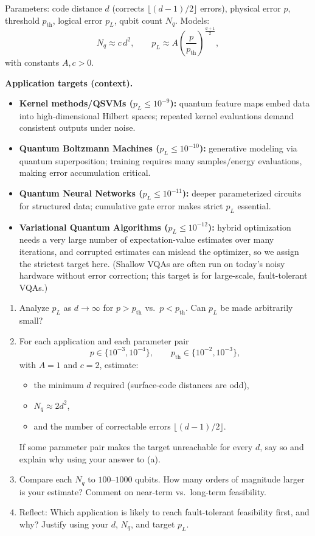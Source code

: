 \documentclass[11pt]{article}
\begin{document}
Parameters: code distance $d$ (corrects $\lfloor(d-1)/2\rfloor$ errors), physical error $p$, threshold $p_{\mathrm{th}}$, logical error $p_L$, qubit count $N_q$. Models:
\[
N_q \approx c\,d^2,\qquad
p_L \approx A\!\left(\frac{p}{p_{\mathrm{th}}}\right)^{\tfrac{d+1}{2}}\!,
\]
with constants $A,c>0$.

\textbf{Application targets (context).}
\begin{itemize}
  \item \textbf{Kernel methods/QSVMs ($p_L\le 10^{-9}$):} quantum feature maps embed data into high-dimensional Hilbert spaces; repeated kernel evaluations demand consistent outputs under noise.
  \item \textbf{Quantum Boltzmann Machines ($p_L\le 10^{-10}$):} generative modeling via quantum superposition; training requires many samples/energy evaluations, making error accumulation critical.
  \item \textbf{Quantum Neural Networks ($p_L\le 10^{-11}$):} deeper parameterized circuits for structured data; cumulative gate error makes strict $p_L$ essential.
  \item \textbf{Variational Quantum Algorithms ($p_L\le 10^{-12}$):} hybrid optimization needs a very large number of expectation-value estimates over many iterations, and corrupted estimates can mislead the optimizer, so we assign the strictest target here. (Shallow VQAs are often run on today's noisy hardware without error correction; this target is for large-scale, fault-tolerant VQAs.)
\end{itemize}

\begin{enumerate}[label=(\alph*)]
  \item Analyze $p_L$ as $d\to\infty$ for $p>p_{\mathrm{th}}$ vs.\ $p<p_{\mathrm{th}}$. Can $p_L$ be made arbitrarily small?
  \item For each application and each parameter pair
  \[
  p\in\{10^{-3},10^{-4}\},\qquad p_{\mathrm{th}}\in\{10^{-2},10^{-3}\},
  \]
  with $A=1$ and $c=2$, estimate:
  \begin{itemize}
    \item the minimum $d$ required (surface-code distances are odd),
    \item $N_q\approx 2d^2$,
    \item and the number of correctable errors $\lfloor(d-1)/2\rfloor$.
  \end{itemize}
  If some parameter pair makes the target unreachable for every $d$, say so and explain why using your answer to (a).
  \item Compare each $N_q$ to $100$--$1000$ qubits. How many orders of magnitude larger is your estimate? Comment on near-term vs.\ long-term feasibility.
  \item Reflect: Which application is likely to reach fault-tolerant feasibility first, and why? Justify using your $d$, $N_q$, and target $p_L$.
\end{enumerate}
\end{document}
